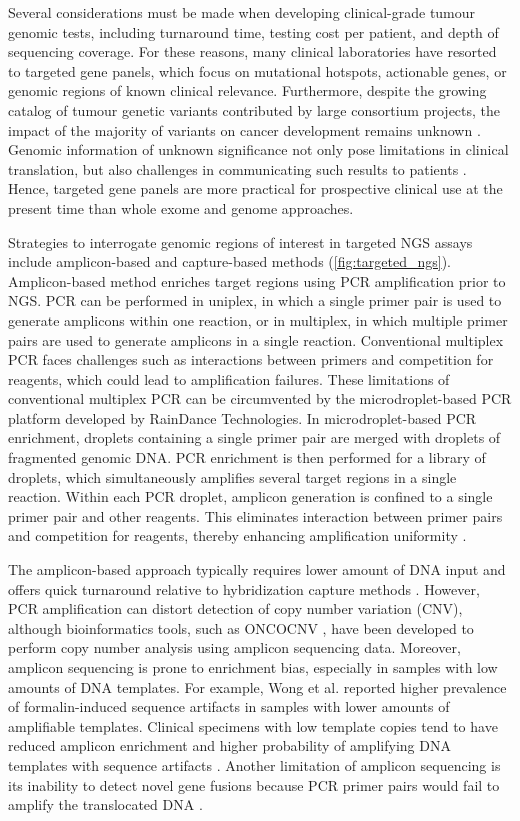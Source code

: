 Several considerations must be made when developing clinical-grade tumour genomic tests, including turnaround time, testing cost per patient, and depth of sequencing coverage. For these reasons, many clinical laboratories have resorted to targeted gene panels, which focus on mutational hotspots, actionable genes, or genomic regions of known clinical relevance. Furthermore, despite the growing catalog of tumour genetic variants contributed by large consortium projects, the impact of the majority of variants on cancer development remains unknown \cite{Sukhai2016, Strom2016, Richards2015}. Genomic information of unknown significance not only pose limitations in clinical translation, but also challenges in communicating such results to patients \cite{Culver2013, Strom2016, Richards2015, Scherr2015}. Hence, targeted gene panels are more practical for prospective clinical use at the present time than whole exome and genome approaches.

Strategies to interrogate genomic regions of interest in targeted NGS assays include amplicon-based and capture-based methods (\autoref{fig:targeted_ngs}). Amplicon-based method enriches target regions using PCR amplification prior to NGS. PCR can be performed in uniplex, in which a single primer pair is used to generate amplicons within one reaction, or in multiplex, in which multiple primer pairs are used to generate amplicons in a single reaction. Conventional multiplex PCR faces challenges such as interactions between primers and competition for reagents, which could lead to amplification failures. These limitations of conventional multiplex PCR can be circumvented by the microdroplet-based PCR platform developed by RainDance Technologies. In microdroplet-based PCR enrichment, droplets containing a single primer pair are merged with droplets of fragmented genomic DNA. PCR enrichment is then performed for a library of droplets, which simultaneously amplifies several target regions in a single reaction. Within each PCR droplet, amplicon generation is confined to a single primer pair and other reagents. This eliminates interaction between primer pairs and competition for reagents, thereby enhancing amplification uniformity \cite{Mamanova2010}.

The amplicon-based approach typically requires lower amount of DNA input and offers quick turnaround relative to hybridization capture methods \cite{Chang2013, Gagan2015}. However, \acs{PCR} amplification can distort detection of copy number variation (\acs{CNV}), although bioinformatics tools, such as ONCOCNV \cite{Boeva2014}, have been developed to perform copy number analysis using amplicon sequencing data. Moreover, amplicon sequencing is prone to enrichment bias, especially in samples with low amounts of DNA templates. For example, Wong et al. \cite{Wong2014} reported higher prevalence of formalin-induced sequence artifacts in samples with lower amounts of amplifiable templates. Clinical specimens with low template copies tend to have reduced amplicon enrichment and higher probability of amplifying DNA templates with sequence artifacts \cite{Wong2014}. Another limitation of amplicon sequencing is its inability to detect novel gene fusions because PCR primer pairs would fail to amplify the translocated DNA \cite{Simon2013, Gagan2015}.

